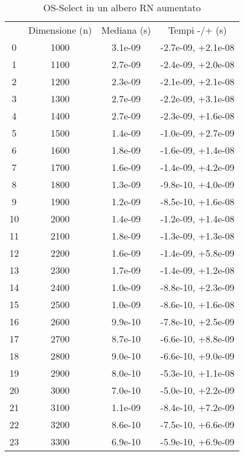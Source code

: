 \begin{table}
\centering
\caption{OS-Select in un albero RN aumentato}
\label{OS-Select in un albero RN aumentato}
\begin{adjustbox}{width=1\textwidth/2}
\begin{tabular}{|c|c|c|c|}
\hline
 & Dimensione (n) & Mediana (s) & Tempi -/+ (s) \\
0 & 1000 & 3.1e-09 & -2.7e-09, +2.1e-08 \\
\cline{1-4}
1 & 1100 & 2.7e-09 & -2.4e-09, +2.0e-08 \\
\cline{1-4}
2 & 1200 & 2.3e-09 & -2.1e-09, +2.1e-08 \\
\cline{1-4}
3 & 1300 & 2.7e-09 & -2.2e-09, +3.1e-08 \\
\cline{1-4}
4 & 1400 & 2.7e-09 & -2.3e-09, +1.6e-08 \\
\cline{1-4}
5 & 1500 & 1.4e-09 & -1.0e-09, +2.7e-09 \\
\cline{1-4}
6 & 1600 & 1.8e-09 & -1.6e-09, +1.4e-08 \\
\cline{1-4}
7 & 1700 & 1.6e-09 & -1.4e-09, +4.2e-09 \\
\cline{1-4}
8 & 1800 & 1.3e-09 & -9.8e-10, +4.0e-09 \\
\cline{1-4}
9 & 1900 & 1.2e-09 & -8.5e-10, +1.6e-08 \\
\cline{1-4}
10 & 2000 & 1.4e-09 & -1.2e-09, +1.4e-08 \\
\cline{1-4}
11 & 2100 & 1.8e-09 & -1.3e-09, +1.3e-08 \\
\cline{1-4}
12 & 2200 & 1.6e-09 & -1.4e-09, +5.8e-09 \\
\cline{1-4}
13 & 2300 & 1.7e-09 & -1.4e-09, +1.2e-08 \\
\cline{1-4}
14 & 2400 & 1.0e-09 & -8.8e-10, +2.3e-09 \\
\cline{1-4}
15 & 2500 & 1.0e-09 & -8.6e-10, +1.6e-08 \\
\cline{1-4}
16 & 2600 & 9.9e-10 & -7.8e-10, +2.5e-09 \\
\cline{1-4}
17 & 2700 & 8.7e-10 & -6.6e-10, +8.8e-09 \\
\cline{1-4}
18 & 2800 & 9.0e-10 & -6.6e-10, +9.0e-09 \\
\cline{1-4}
19 & 2900 & 8.0e-10 & -5.3e-10, +1.1e-08 \\
\cline{1-4}
20 & 3000 & 7.0e-10 & -5.0e-10, +2.2e-09 \\
\cline{1-4}
21 & 3100 & 1.1e-09 & -8.4e-10, +7.2e-09 \\
\cline{1-4}
22 & 3200 & 8.6e-10 & -7.5e-10, +6.6e-09 \\
\cline{1-4}
23 & 3300 & 6.9e-10 & -5.9e-10, +6.9e-09 \\

\end{tabular}
\end{adjustbox}
\end{table}
